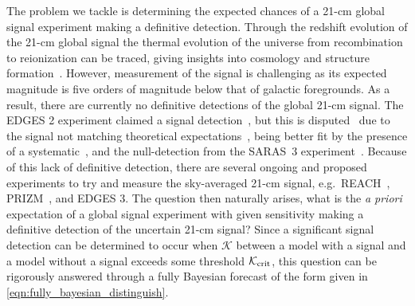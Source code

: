 \documentclass[twocolumn,english,aps,prl,amsmath,amssymb,reprint,footinbib,floatfix,showkeys]{revtex4-2}
\newcommand{\br}{\mathcal{K}}
\begin{document}
The problem we tackle is determining the expected chances of a 21-cm global signal experiment making a definitive detection. 
Through the redshift evolution of the 21-cm global signal the thermal evolution of the universe from recombination to reionization can be traced, giving insights into cosmology and structure formation~\citep[see][for a more detailed introduction to the field]{Furlanetto_2006}. 
However, measurement of the signal is challenging as its expected magnitude is five orders of magnitude below that of galactic foregrounds. 
As a result, there are currently no definitive detections of the global 21-cm signal.
The EDGES 2 experiment claimed a signal detection~\citep{EDGES}, but this is disputed~\citep[e.g.][]{Hills_2018} due to the signal not matching theoretical expectations~\citep[e.g.][]{Barkana_2018}, being better fit by the presence of a systematic~\citep[e.g.][]{Sims_2020}, and the null-detection from the SARAS~3 experiment~\citep{SARAS3}. 
Because of this lack of definitive detection, there are several ongoing and proposed experiments to try and measure the sky-averaged 21-cm signal, e.g.\ REACH~\citep{REACH}, PRIZM~\citep{PRIZM}, and EDGES 3.
The question then naturally arises, what is the \textit{a priori} expectation of a global signal experiment with given sensitivity making a definitive detection of the uncertain 21-cm signal? 
Since a significant signal detection can be determined to occur when $\br$ between a model with a signal and a model without a signal exceeds some threshold $\br_{\rm crit}$, this question can be rigorously answered through a fully Bayesian forecast of the form given in \cref{eqn:fully_bayesian_distinguish}.
\end{document}
